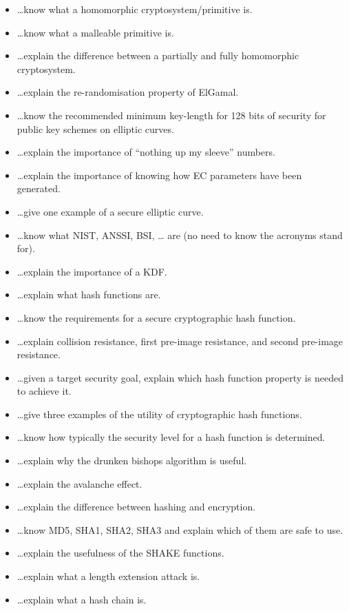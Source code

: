 \documentclass[usegeometry,parskip=half]{scrartcl}
\begin{document}
\begin{itemize}
  \item \dots{}know what a homomorphic cryptosystem/primitive is.
  \item \dots{}know what a malleable primitive is.
  \item \dots{}explain the difference between a partially and fully homomorphic cryptosystem.
  \item \dots{}explain the re-randomisation property of ElGamal.
  \item \dots{}know the recommended minimum key-length for 128 bits of security for public key schemes on elliptic curves.
  \item \dots{}explain the importance of \enquote{nothing up my sleeve} numbers.
  \item \dots{}explain the importance of knowing how EC parameters have been generated.
  \item \dots{}give one example of a secure elliptic curve.
  \item \dots{}know what NIST, ANSSI, BSI, \dots{} are (no need to know the acronyms stand for).
  \item \dots{}explain the importance of a KDF.
  \item \dots{}explain what hash functions are.
  \item \dots{}know the requirements for a secure cryptographic hash function.
  \item \dots{}explain collision resistance, first pre-image resistance, and second pre-image resistance.
  \item \dots{}given a target security goal, explain which hash function property is needed to achieve it.
  \item \dots{}give three examples of the utility of cryptographic hash functions.
  \item \dots{}know how typically the security level for a hash function is determined.
  \item \dots{}explain why the drunken bishops algorithm is useful.
  \item \dots{}explain the avalanche effect.
  \item \dots{}explain the difference between hashing and encryption.
  \item \dots{}know MD5, SHA1, SHA2, SHA3 and explain which of them are safe to use.
  \item \dots{}explain the usefulness of the SHAKE functions.
  \item \dots{}explain what a length extension attack is.
  \item \dots{}explain what a hash chain is.

\end{itemize}
\end{document}
